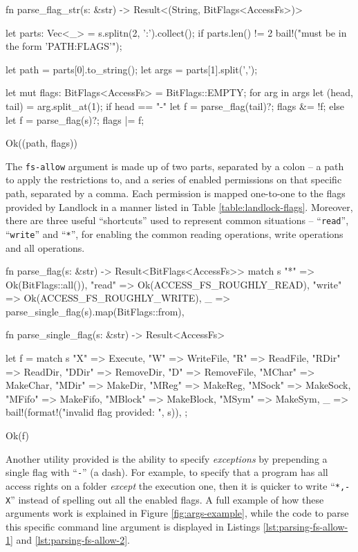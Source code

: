 \begin{code}[language=Rust, caption=Parsing the \texttt{fs-allow} command line option., label=lst:parsing-fs-allow-1]
fn parse_flag_str(s: &str)
    -> Result<(String, BitFlags<AccessFs>)> {
  let parts: Vec<_> = s.splitn(2, ':').collect();
  if parts.len() != 2 {
    bail!("must be in the form 'PATH:FLAGS'");
  }

  let path = parts[0].to_string();
  let args = parts[1].split(',');

  let mut flags: BitFlags<AccessFs> = BitFlags::EMPTY;
  for arg in args {
    let (head, tail) = arg.split_at(1);
    if head == "-" {
      let f = parse_flag(tail)?;
      flags &= !f;
    } else {
      let f = parse_flag(s)?;
      flags |= f;
    }
  }

  Ok((path, flags))
}
\end{code}

The \texttt{fs-allow} argument is made up of two parts, separated by a colon -- a path to apply the restrictions to,
and a series of enabled permissions on that specific path, separated by a comma.
Each permission is mapped one-to-one to the flags provided by Landlock in a manner listed in Table \ref{table:landlock-flags}.
Moreover, there are three useful ``shortcuts'' used to represent common situations -- ``\texttt{read}'', ``\texttt{write}'' and ``\texttt{*}'',
for enabling the common reading operations, write operations and all operations.

\begin{code}[language=Rust, caption=Parsing a single Landlock flag., label=lst:parsing-fs-allow-2]
fn parse_flag(s: &str) -> Result<BitFlags<AccessFs>> {
  match s {
    "*" => Ok(BitFlags::all()),
    "read" => Ok(ACCESS_FS_ROUGHLY_READ),
    "write" => Ok(ACCESS_FS_ROUGHLY_WRITE),
    _ => parse_single_flag(s).map(BitFlags::from),
  }
}

fn parse_single_flag(s: &str) -> Result<AccessFs> {
  let f = match s {
    "X" => Execute,
    "W" => WriteFile,
    "R" => ReadFile,
    "RDir" => ReadDir,
    "DDir" => RemoveDir,
    "D" => RemoveFile,
    "MChar" => MakeChar,
    "MDir" => MakeDir,
    "MReg" => MakeReg,
    "MSock" => MakeSock,
    "MFifo" => MakeFifo,
    "MBlock" => MakeBlock,
    "MSym" => MakeSym,
    _ => bail!(format!("invalid flag provided: {}", s)),
  };

  Ok(f)
}
\end{code}

Another utility provided is the ability to specify \textit{exceptions} by prepending a single flag with ``\texttt{-}'' (a dash).
For example, to specify that a program has all access rights on a folder \textit{except} the execution one, then it is quicker
to write ``\texttt{*,-X}'' instead of spelling out all the enabled flags.
A full example of how these arguments work is explained in Figure \ref{fig:args-example},
while the code to parse this specific command line argument is displayed
in Listings \ref{lst:parsing-fs-allow-1} and \ref{lst:parsing-fs-allow-2}.

